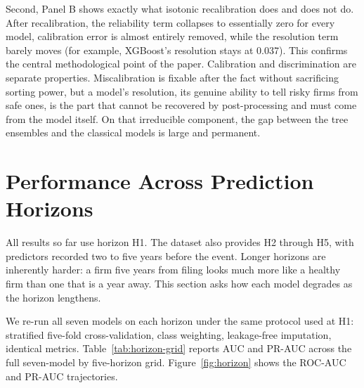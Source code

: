 \documentclass[12pt,a4paper]{article}
\begin{document}
Second, Panel B shows exactly what isotonic recalibration does and does not
do. After recalibration, the reliability term collapses to essentially zero
for every model, calibration error is almost entirely removed, while the
resolution term barely moves (for example, XGBoost's resolution stays at
0.037). This confirms the central methodological point of the paper.
Calibration and discrimination are separate properties. Miscalibration is
fixable after the fact without sacrificing sorting power, but a model's
resolution, its genuine ability to tell risky firms from safe ones, is the
part that cannot be recovered by post-processing and must come from the model
itself. On that irreducible component, the gap
between the tree ensembles and the classical models is large and permanent.

\clearpage
\section{Performance Across Prediction Horizons}\label{sec:horizons}

All results so far use horizon H1. The dataset also provides H2 through H5,
with predictors recorded two to five years before the event. Longer horizons
are inherently harder: a firm five years from filing looks much more like a
healthy firm than one that is a year away. This section asks how each model
degrades as the horizon lengthens.

We re-run all seven models on each horizon under the same protocol used at H1:
stratified five-fold cross-validation, class weighting, leakage-free
imputation, identical metrics. Table~\ref{tab:horizon-grid} reports AUC and
PR-AUC across the full seven-model by five-horizon grid. Figure~\ref{fig:horizon}
shows the ROC-AUC and PR-AUC trajectories.
\end{document}
